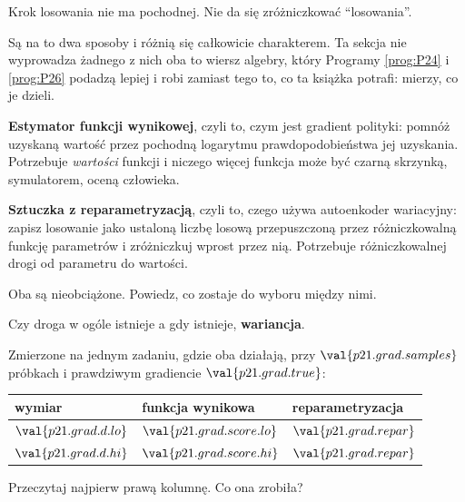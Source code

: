 \begin{fr}
\begin{ansblock}
Krok losowania nie ma pochodnej. Nie da się zróżniczkować \enquote{losowania}.
\end{ansblock}

Są na to dwa sposoby i różnią się całkowicie charakterem. Ta sekcja nie
wyprowadza żadnego z nich \dash{} oba to wiersz algebry, który Programy
\ref{prog:P24} i \ref{prog:P26} podadzą lepiej \dash{} i robi zamiast tego to,
co ta książka potrafi: mierzy, co je dzieli.

\end{fr}

\begin{fr}
\textbf{Estymator funkcji wynikowej}, czyli to, czym jest gradient polityki:
pomnóż uzyskaną wartość przez pochodną logarytmu prawdopodobieństwa jej
uzyskania. Potrzebuje \emph{wartości} funkcji i niczego więcej \dash{} funkcja
może być czarną skrzynką, symulatorem, oceną człowieka.

\textbf{Sztuczka z reparametryzacją}, czyli to, czego używa autoenkoder
wariacyjny: zapisz losowanie jako ustaloną liczbę losową przepuszczoną przez
różniczkowalną funkcję parametrów i zróżniczkuj wprost przez nią. Potrzebuje
różniczkowalnej drogi od parametru do wartości.

Oba są nieobciążone. Powiedz, co zostaje do wyboru między nimi.
\nextframe
\end{fr}

\begin{fr}
\begin{ansblock}
Czy droga w ogóle istnieje \dash{} a gdy istnieje, \textbf{wariancja}.
\end{ansblock}

Zmierzone na jednym zadaniu, gdzie oba działają, przy
$\val{p21.grad.samples}$ próbkach i prawdziwym gradiencie
$\val{p21.grad.true}$:

\begin{center}
\begin{tabular}{lll}
\toprule
wymiar & funkcja wynikowa & reparametryzacja \\
\midrule
$\val{p21.grad.d.lo}$ & $\val{p21.grad.score.lo}$ & $\val{p21.grad.repar}$ \\
$\val{p21.grad.d.hi}$ & $\val{p21.grad.score.hi}$ & $\val{p21.grad.repar}$ \\
\bottomrule
\end{tabular}
\end{center}

Przeczytaj najpierw prawą kolumnę. Co ona zrobiła?
\nextframe
\end{fr}

